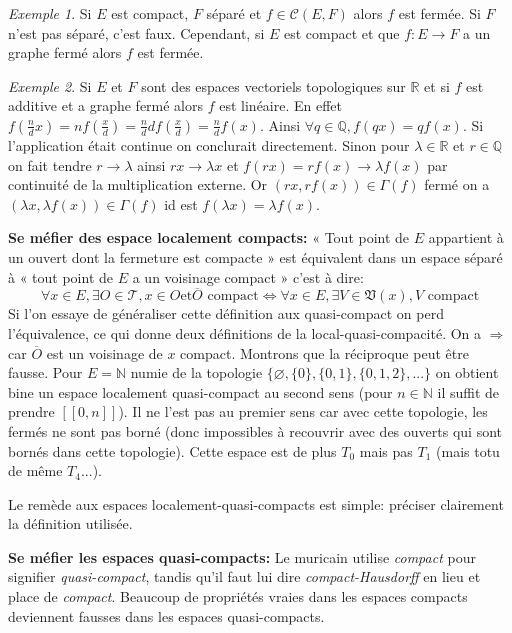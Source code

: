 \documentclass[a4paper, 11pt, french]{book}
\theoremstyle{plain} %
\theoremstyle{definition} %
\theoremstyle{remark} %
\newtheorem{exemple}{Exemple}
\newcommand{\1}{\mathds{1}}
\newcommand\vide{\varnothing}
\newcommand{\et}{\mathrel{\mathrm{et}}}
\newcommand{\N}{\mathbb{N}}
\newcommand{\Q}{\mathbb{Q}}
\newcommand{\R}{\mathbb{R}}
\renewcommand{\cal}[1]{\mathcal{#1}}
\renewcommand{\frak}[1]{\mathfrak{#1}}
\newcommand{\scr}[1]{\mathscr{#1}}
\newcommand\intervalle[1]{[\![#1]\!]}
\begin{document}
\begin{exemple}
	Si $E$ est compact, $F$ séparé et $f\in\cal{C}(E, F)$ alors $f$ est fermée.
	Si $F$ n'est pas séparé, c'est faux.
	Cependant, si $E$ est compact et que $f:E\rightarrow F$ a un graphe fermé alors $f$ est fermée.
\end{exemple}

\begin{exemple}
	Si $E$ et $F$ sont des espaces vectoriels topologiques sur $\R$ et si $f$ est additive et a graphe fermé alors $f$ est linéaire.
	En effet $f(\frac{n}{d}x)=nf(\frac{x}{d})=\frac{n}{d}df(\frac{x}{d})=\frac{n}{d}f(x)$.
	Ainsi $\forall q\in\Q, f(qx)=qf(x)$.
	Si l'application était continue on conclurait directement.
	Sinon pour $\lambda\in\R$ et $r\in\Q$ on fait tendre $r\rightarrow\lambda$ ainsi $rx\rightarrow\lambda x$ et $f(rx)=rf(x)\rightarrow\lambda f(x)$ par continuité de la multiplication externe.
	Or $(rx, rf(x))\in\Gamma(f)$ fermé on a $(\lambda x, \lambda f(x))\in\Gamma(f)$ id est $f(\lambda x)=\lambda f(x)$.
\end{exemple}

\textbf{Se méfier des espace localement compacts:}
« Tout point de $E$ appartient à un ouvert dont la fermeture est compacte » est équivalent dans un espace séparé à « tout point de $E$ a un voisinage compact » c'est à dire:
$$
	\forall x\in E, \exists O\in\scr{T}, x\in O\et\overline{O}\text{ compact}
	\iff
	\forall x\in E, \exists V\in\frak{V}(x), V\text{ compact}
$$
Si l'on essaye de généraliser cette définition aux quasi-compact on perd l'équivalence, ce qui donne deux définitions de la local-quasi-compacité.
On a $\Rightarrow$ car $\overline{O}$ est un voisinage de $x$ compact.
Montrons que la réciproque peut être fausse.
Pour $E=\N$ numie de la topologie $\{\vide, \{0\}, \{0, 1\}, \{0, 1, 2\}, ...\}$ on obtient bine un espace localement quasi-compact au second sens (pour $n\in\N$ il suffit de prendre $\intervalle{0, n}$).
Il ne l'est pas au premier sens car avec cette topologie, les fermés ne sont pas borné (donc impossibles à recouvrir avec des ouverts qui sont bornés dans cette topologie).
Cette espace est de plus $T_0$ mais pas $T_1$ (mais totu de même $T_4$...).

Le remède aux espaces localement-quasi-compacts est simple: préciser clairement la définition utilisée.

\textbf{Se méfier les espaces quasi-compacts:}
Le muricain utilise \textit{compact} pour signifier \textit{quasi-compact}, tandis qu'il faut lui dire \textit{compact-Hausdorff} en lieu et place de \textit{compact}.
Beaucoup de propriétés vraies dans les espaces compacts deviennent fausses dans les espaces quasi-compacts.
\end{document}
